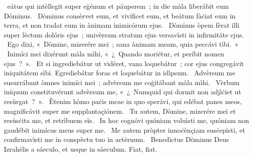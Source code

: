 { }
{%
~eátus qui intèllegit super eġénum et páuperem~; in die màla liberábit eum Dòminus. 
~Dòminus consèrvet eum, et vivíficet eum, et beátum fàċiat eum in terra, et non tradat eum in ànimam inimicórum ejus. 
~Dòminus òpem fèrat illi super lèctum dolóris ejus~; univèrsum stratum ejus versavìsti in infirmitáte ejus. 
~Ego dixi, «~Dòmine, mizerére mei~; sana ànimam meam, quia peccávi tìbi.~»
~Inimíci mei dixérunt màla mìhi, «~¿~Quando moriétur, et períbit nomen ejus~?~». 
~Et si ingrediebátur ut vidéret, vana loquebátur~; cor ejus congregávit iniquitátem sìbi. Egrediebátur foras et loquebátur in idìpsum. 
~Advèrsum me susurrábant òmnes inimíci mei~; advèrsum me coġitábant màla mìhi. 
~Vèrbum iníquum constituvérunt advèrsum me, «~¿~Numquid qui dormit non adjìċiet ut resùrgat~?~». 
~Ètenim hòmo paċis meae in quo sperávi, qui edébat panes meos, magnificávit super me supplantaçiónem. 
~Tu autem, Dòmine, mizerére mei et resùsċita me, et retrìbuem eïs. 
~In hoc cognóvi quóniam voluìsti me, quóniam non gaudébit inimícus meus super me. 
~Me autem pròpter innoċènçiam susċepìsti, et confirmavìsti me in conspèctu tuo in aetèrnum. 
~Benedìctus Dòminus Deus Izrahélis a sáeculo, et usque in sáeculum. Fiat, fiat. 
}
